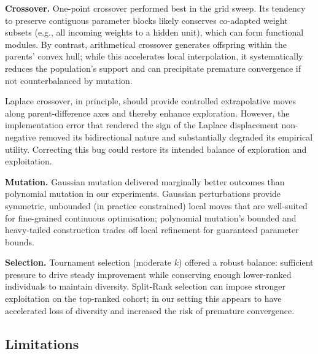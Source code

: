 \documentclass[12pt, a4paper]{article}
\begin{document}
		\textbf{Crossover.} One-point crossover performed best in the grid sweep. Its tendency to preserve contiguous parameter blocks likely conserves co-adapted weight subsets (e.g., all incoming weights to a hidden unit), which can form functional modules. By contrast, arithmetical crossover generates offspring within the parents' convex hull; while this accelerates local interpolation, it systematically reduces the population's support and can precipitate premature convergence if not counterbalanced by mutation.

Laplace crossover, in principle, should provide controlled extrapolative moves along parent-difference axes and thereby enhance exploration. However, the implementation error that rendered the sign of the Laplace displacement non-negative removed its bidirectional nature and substantially degraded its empirical utility. Correcting this bug could restore its intended balance of exploration and exploitation.

    	\textbf{Mutation.} Gaussian mutation delivered marginally better outcomes than polynomial mutation in our experiments. Gaussian perturbations provide symmetric, unbounded (in practice constrained) local moves that are well-suited for fine-grained continuous optimisation; polynomial mutation's bounded and heavy-tailed construction trades off local refinement for guaranteed parameter bounds.

    	\textbf{Selection.} Tournament selection (moderate $k$) offered a robust balance: sufficient pressure to drive steady improvement while conserving enough lower-ranked individuals to maintain diversity. Split-Rank selection can impose stronger exploitation on the top-ranked cohort; in our setting this appears to have accelerated loss of diversity and increased the risk of premature convergence.

\subsection{Limitations}
\label{sec:limitations}
\end{document}
